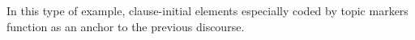 
In this type of example,
clause-initial elements especially coded by topic markers function as an anchor to the previous discourse.

